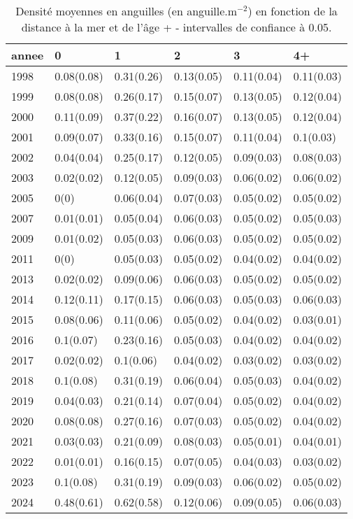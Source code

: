 \begin{table}[htbp]
\centering
\caption[Densité âge et distance.]{Densité moyennes en anguilles (en anguille.m$^{-2}$) en fonction de la distance à la mer et de l'âge + - intervalles de confiance à 0.05.} 
\label{table_densite_age_annee}
\begin{tabular}{llllll}
  \hline
annee & 0 & 1 & 2 & 3 & 4+ \\ 
  \hline
1998 & 0.08(0.08) & 0.31(0.26) & 0.13(0.05) & 0.11(0.04) & 0.11(0.03) \\ 
  1999 & 0.08(0.08) & 0.26(0.17) & 0.15(0.07) & 0.13(0.05) & 0.12(0.04) \\ 
  2000 & 0.11(0.09) & 0.37(0.22) & 0.16(0.07) & 0.13(0.05) & 0.12(0.04) \\ 
  2001 & 0.09(0.07) & 0.33(0.16) & 0.15(0.07) & 0.11(0.04) & 0.1(0.03) \\ 
  2002 & 0.04(0.04) & 0.25(0.17) & 0.12(0.05) & 0.09(0.03) & 0.08(0.03) \\ 
  2003 & 0.02(0.02) & 0.12(0.05) & 0.09(0.03) & 0.06(0.02) & 0.06(0.02) \\ 
  2005 & 0(0) & 0.06(0.04) & 0.07(0.03) & 0.05(0.02) & 0.05(0.02) \\ 
  2007 & 0.01(0.01) & 0.05(0.04) & 0.06(0.03) & 0.05(0.02) & 0.05(0.03) \\ 
  2009 & 0.01(0.02) & 0.05(0.03) & 0.06(0.03) & 0.05(0.02) & 0.05(0.02) \\ 
  2011 & 0(0) & 0.05(0.03) & 0.05(0.02) & 0.04(0.02) & 0.04(0.02) \\ 
  2013 & 0.02(0.02) & 0.09(0.06) & 0.06(0.03) & 0.05(0.02) & 0.05(0.02) \\ 
  2014 & 0.12(0.11) & 0.17(0.15) & 0.06(0.03) & 0.05(0.03) & 0.06(0.03) \\ 
  2015 & 0.08(0.06) & 0.11(0.06) & 0.05(0.02) & 0.04(0.02) & 0.03(0.01) \\ 
  2016 & 0.1(0.07) & 0.23(0.16) & 0.05(0.03) & 0.04(0.02) & 0.04(0.02) \\ 
  2017 & 0.02(0.02) & 0.1(0.06) & 0.04(0.02) & 0.03(0.02) & 0.03(0.02) \\ 
  2018 & 0.1(0.08) & 0.31(0.19) & 0.06(0.04) & 0.05(0.03) & 0.04(0.02) \\ 
  2019 & 0.04(0.03) & 0.21(0.14) & 0.07(0.04) & 0.05(0.02) & 0.04(0.02) \\ 
  2020 & 0.08(0.08) & 0.27(0.16) & 0.07(0.03) & 0.05(0.02) & 0.04(0.02) \\ 
  2021 & 0.03(0.03) & 0.21(0.09) & 0.08(0.03) & 0.05(0.01) & 0.04(0.01) \\ 
  2022 & 0.01(0.01) & 0.16(0.15) & 0.07(0.05) & 0.04(0.03) & 0.03(0.02) \\ 
  2023 & 0.1(0.08) & 0.31(0.19) & 0.09(0.03) & 0.06(0.02) & 0.05(0.02) \\ 
  2024 & 0.48(0.61) & 0.62(0.58) & 0.12(0.06) & 0.09(0.05) & 0.06(0.03) \\ 
   \hline
\end{tabular}
\end{table}
